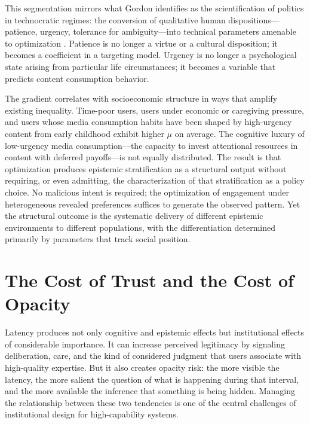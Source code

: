 \documentclass[12pt]{article}
\begin{document}
This segmentation mirrors what Gordon identifies as the scientification of politics in technocratic regimes: the conversion of qualitative human dispositions---patience, urgency, tolerance for ambiguity---into technical parameters amenable to optimization \citep{GordonTechnocracy2025}. Patience is no longer a virtue or a cultural disposition; it becomes a coefficient in a targeting model. Urgency is no longer a psychological state arising from particular life circumstances; it becomes a variable that predicts content consumption behavior.

The gradient correlates with socioeconomic structure in ways that amplify existing inequality. Time-poor users, users under economic or caregiving pressure, and users whose media consumption habits have been shaped by high-urgency content from early childhood exhibit higher $\mu$ on average. The cognitive luxury of low-urgency media consumption---the capacity to invest attentional resources in content with deferred payoffs---is not equally distributed. The result is that optimization produces epistemic stratification as a structural output without requiring, or even admitting, the characterization of that stratification as a policy choice. No malicious intent is required; the optimization of engagement under heterogeneous revealed preferences suffices to generate the observed pattern. Yet the structural outcome is the systematic delivery of different epistemic environments to different populations, with the differentiation determined primarily by parameters that track social position.

\section{The Cost of Trust and the Cost of Opacity}

Latency produces not only cognitive and epistemic effects but institutional effects of considerable importance. It can increase perceived legitimacy by signaling deliberation, care, and the kind of considered judgment that users associate with high-quality expertise. But it also creates opacity risk: the more visible the latency, the more salient the question of what is happening during that interval, and the more available the inference that something is being hidden. Managing the relationship between these two tendencies is one of the central challenges of institutional design for high-capability systems.
\end{document}
